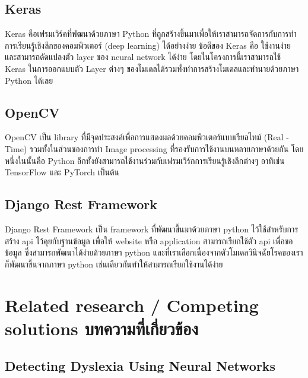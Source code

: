 \documentclass[12pt,oneside,openright,a4paper]{cpe-thai-project}
\begin{document}
\subsection{Keras}
Keras คือเฟรมเวิร์คที่พัฒนาด้วยภาษา Python ที่ถูกสร้างขึ้นมาเพื่อให้เราสามารถจัดการกับการทำ การเรียนรู้เชิงลึกของคอมพิวเตอร์ (deep learning) 
ได้อย่างง่าย ข้อดีของ Keras คือ ใช้งานง่าย และสามารถดัดแปลงตัว layer ของ neural network ได้ง่าย  โดยในโครงการนี้เราสามารถใช้ Keras 
ในการออกแบบตัว Layer ต่างๆ ของโมเดลได้รวมทั้งทำการสร้างโมเดลและทำนายด้วยภาษา Python ได้เลย

\subsection{OpenCV\cite{OpenCV}}
OpenCV เป็น library ที่มีจุดประสงค์เพื่อการแสดงผลด้วยคอมพิวเตอร์แบบเรียลไทม์  (Real - Time) รวมทั้งในส่วนของการทำ Image processing ที่รองรับการใช้งานบนหลายภาษาด้วยกัน
 โดยหนึ่งในนั้นคือ Python อีกทั้งยังสามารถใช้งานร่วมกับเฟรมเวิร์กการเรียนรู้เชิงลึกต่างๆ อาทิเช่น TensorFlow และ PyTorch  เป็นต้น 

\subsection{Django Rest Framework}
Django Rest Framework เป็น framework ที่พัฒนาขึ้นมาด้วยภาษา python ไว้ใช้สำหรับการสร้าง api ไว้คุยกับฐานข้อมูล  
เพื่อให้ website หรือ application สามารถเรียกใช้ตัว api เพื่อขอข้อมูล  ซึ่งสามารถพัฒนาได้ง่ายด้วยภาษา python
และที่เราเลือกเนื่องจากตัวโมเดลวินิจฉัยโรคของเราก็พัฒนาขึ้นจากภาษา python เช่นเดียวกันทำให้สามารถเรียกใช้งานได้ง่าย

\section{Related research / Competing solutions บทความที่เกี่ยวข้อง}

\subsection{Detecting Dyslexia Using Neural Networks\cite{Dyslexia}}
\begin{figure}[!ht]\centering
  \setlength{\fboxrule}{0.2mm} %
  \setlength{\fboxsep}{1cm}
\end{figure}
\end{document}
